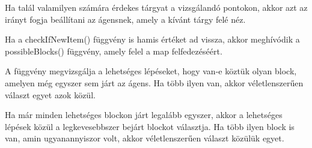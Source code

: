 Ha talál valamilyen számára érdekes tárgyat a vizsgálandó pontokon, akkor azt az irányt fogja beállítani az ágensnek, amely a kívánt tárgy felé néz.

Ha a checkIfNewItem() függvény is hamis értéket ad vissza, akkor meghívódik a possibleBlocks() függvény, amely felel a map felfedezéséért.

A függvény megvizsgálja a lehetséges lépéseket, hogy van-e köztük olyan block, amelyen még egyszer sem járt az ágens. Ha több ilyen van, akkor
véletlenszerűen választ egyet azok közül.

Ha már minden lehetséges blockon járt legalább egyszer, akkor a lehetséges lépések közül a legkevesebbszer bejárt blockot választja. Ha 
több ilyen block is van, amin ugyanannyiszor volt, akkor véletlenszerűen választ közülük egyet.
